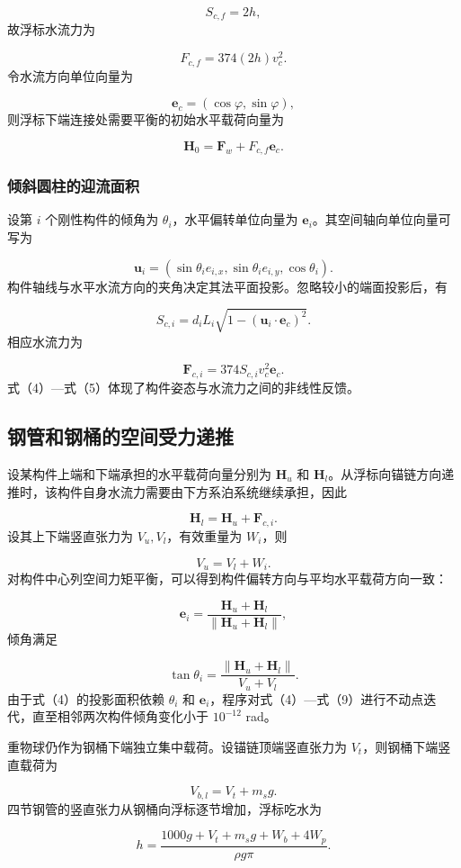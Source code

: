 \documentclass[UTF8,zihao=-4,a4paper,fontset=fandol]{ctexart}
\begin{document}
\[
S_{c,f}=2h,
\]
故浮标水流力为

\[
F_{c,f}=374(2h)v_c^2. \tag{2}
\]
令水流方向单位向量为

\[
\boldsymbol e_c=(\cos\varphi,\sin\varphi),
\]
则浮标下端连接处需要平衡的初始水平载荷向量为

\[
\boldsymbol H_0
=\boldsymbol F_w+F_{c,f}\boldsymbol e_c. \tag{3}
\]
\subsubsection{倾斜圆柱的迎流面积}
设第 \(i\) 个刚性构件的倾角为 \(\theta_i\)，水平偏转单位向量为 \(\boldsymbol e_i\)。其空间轴向单位向量可写为

\[
\boldsymbol u_i=
(\sin\theta_i e_{i,x},
\sin\theta_i e_{i,y},
\cos\theta_i).
\]
构件轴线与水平水流方向的夹角决定其法平面投影。忽略较小的端面投影后，有

\[
S_{c,i}=d_iL_i
\sqrt{1-(\boldsymbol u_i\cdot\boldsymbol e_c)^2}. \tag{4}
\]
相应水流力为

\[
\boldsymbol F_{c,i}
=374S_{c,i}v_c^2\boldsymbol e_c. \tag{5}
\]
式（4）—式（5）体现了构件姿态与水流力之间的非线性反馈。

\subsection{钢管和钢桶的空间受力递推}
设某构件上端和下端承担的水平载荷向量分别为 \(\boldsymbol H_u\) 和 \(\boldsymbol H_l\)。从浮标向锚链方向递推时，该构件自身水流力需要由下方系泊系统继续承担，因此

\[
\boldsymbol H_l
=\boldsymbol H_u+\boldsymbol F_{c,i}. \tag{6}
\]
设其上下端竖直张力为 \(V_u,V_l\)，有效重量为 \(W_i\)，则

\[
V_u=V_l+W_i. \tag{7}
\]
对构件中心列空间力矩平衡，可以得到构件偏转方向与平均水平载荷方向一致：

\[
\boldsymbol e_i=
\frac{\boldsymbol H_u+\boldsymbol H_l}
{\|\boldsymbol H_u+\boldsymbol H_l\|}, \tag{8}
\]
倾角满足

\[
\tan\theta_i=
\frac{\|\boldsymbol H_u+\boldsymbol H_l\|}
{V_u+V_l}. \tag{9}
\]
由于式（4）的投影面积依赖 \(\theta_i\) 和 \(\boldsymbol e_i\)，程序对式（4）—式（9）进行不动点迭代，直至相邻两次构件倾角变化小于 \(10^{-12}\) rad。

重物球仍作为钢桶下端独立集中载荷。设锚链顶端竖直张力为 \(V_t\)，则钢桶下端竖直载荷为

\[
V_{b,l}=V_t+m_sg.
\]
四节钢管的竖直张力从钢桶向浮标逐节增加，浮标吃水为

\[
h=\frac{1000g+V_t+m_sg+W_b+4W_p}{\rho g\pi}. \tag{10}
\]
\end{document}
